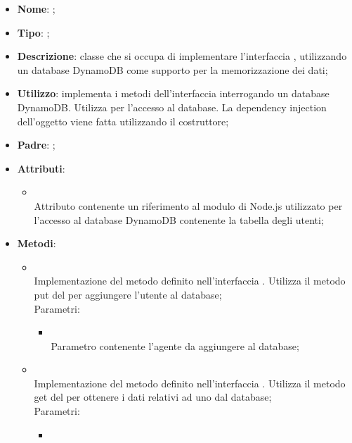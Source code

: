 \begin{itemize}
	\item \textbf{Nome}: ;
	\item \textbf{Tipo}: ;
	\item \textbf{Descrizione}: classe che si occupa di implementare l'interfaccia , utilizzando un database DynamoDB come supporto per la memorizzazione dei dati;
	\item \textbf{Utilizzo}: implementa i metodi dell'interfaccia  interrogando un database DynamoDB. Utilizza  per l'accesso al database. La dependency injection dell'oggetto  viene fatta utilizzando il costruttore;
	\item \textbf{Padre}: ;
	\item \textbf{Attributi}:
	\begin{itemize}
		\item[]  \\
		Attributo contenente un riferimento al modulo di Node.js utilizzato per l'accesso al database DynamoDB contenente la tabella degli utenti;
	\end{itemize}
	\item \textbf{Metodi}:
	\begin{itemize}
		\item[]  \\
		Implementazione del metodo definito nell'interfaccia . Utilizza il metodo put del  per aggiungere l'utente al database;\\
		Parametri:
		\begin{itemize}
			\item {} \\
			Parametro contenente l'agente da aggiungere al database;
		\end{itemize}
		\item[]  \\
		Implementazione del metodo definito nell'interfaccia . Utilizza il metodo get del  per ottenere i dati relativi ad uno  dal database;\\
		Parametri:
		\begin{itemize}
			\item {} \\

\end{itemize}
\end{itemize}
\end{itemize}
